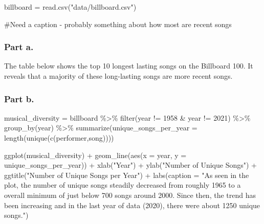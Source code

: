 \documentclass[
]{article}
\newenvironment{Shaded}{\begin{snugshade}}{\end{snugshade}}
\newcommand{\AttributeTok}[1]{\textcolor[rgb]{0.77,0.63,0.00}{#1}}
\newcommand{\DecValTok}[1]{\textcolor[rgb]{0.00,0.00,0.81}{#1}}
\newcommand{\FunctionTok}[1]{\textcolor[rgb]{0.00,0.00,0.00}{#1}}
\newcommand{\NormalTok}[1]{#1}
\newcommand{\OtherTok}[1]{\textcolor[rgb]{0.56,0.35,0.01}{#1}}
\newcommand{\SpecialCharTok}[1]{\textcolor[rgb]{0.00,0.00,0.00}{#1}}
\newcommand{\StringTok}[1]{\textcolor[rgb]{0.31,0.60,0.02}{#1}}
\begin{document}
\begin{Shaded}
\begin{Highlighting}[]
\NormalTok{billboard }\OtherTok{=} \FunctionTok{read.csv}\NormalTok{(}\StringTok{"data/billboard.csv"}\NormalTok{)}
\end{Highlighting}
\end{Shaded}

\#Need a caption - probably something about how most are recent songs

\hypertarget{part-a.-1}{%
\subsubsection{Part a.}\label{part-a.-1}}

The table below shows the top 10 longest lasting songs on the Billboard
100. It reveals that a majority of these long-lasting songs are more
recent songs.

\hypertarget{part-b.-1}{%
\subsubsection{Part b.}\label{part-b.-1}}

\begin{Shaded}
\begin{Highlighting}[]
\NormalTok{musical\_diversity }\OtherTok{=}\NormalTok{ billboard }\SpecialCharTok{\%\textgreater{}\%}
  \FunctionTok{filter}\NormalTok{(year }\SpecialCharTok{!=} \DecValTok{1958} \SpecialCharTok{\&}\NormalTok{ year }\SpecialCharTok{!=} \DecValTok{2021}\NormalTok{) }\SpecialCharTok{\%\textgreater{}\%}
  \FunctionTok{group\_by}\NormalTok{(year) }\SpecialCharTok{\%\textgreater{}\%}
  \FunctionTok{summarize}\NormalTok{(}\AttributeTok{unique\_songs\_per\_year =} \FunctionTok{length}\NormalTok{(}\FunctionTok{unique}\NormalTok{(}\FunctionTok{c}\NormalTok{(performer,song))))}

\FunctionTok{ggplot}\NormalTok{(musical\_diversity) }\SpecialCharTok{+} \FunctionTok{geom\_line}\NormalTok{(}\FunctionTok{aes}\NormalTok{(}\AttributeTok{x =}\NormalTok{ year, }\AttributeTok{y =}\NormalTok{ unique\_songs\_per\_year)) }\SpecialCharTok{+} \FunctionTok{xlab}\NormalTok{(}\StringTok{"Year"}\NormalTok{) }\SpecialCharTok{+} \FunctionTok{ylab}\NormalTok{(}\StringTok{"Number of Unique Songs"}\NormalTok{) }\SpecialCharTok{+} \FunctionTok{ggtitle}\NormalTok{(}\StringTok{"Number of Unique Songs per Year"}\NormalTok{) }\SpecialCharTok{+} \FunctionTok{labs}\NormalTok{(}\AttributeTok{caption =} \StringTok{"As seen in the plot, the number of unique songs steadily decreased from roughly 1965 to a overall minimum of just below 700 songs around 2000. Since then, the trend has been increasing and in the last year of data (2020), there were about 1250 unique songs."}\NormalTok{)}
\end{Highlighting}
\end{Shaded}
\end{document}
